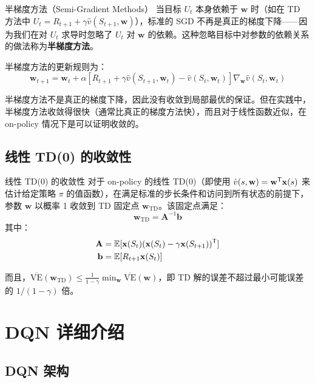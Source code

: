 \begin{mydefinition}{半梯度方法（Semi-Gradient Methods）}
当目标 $U_t$ 本身依赖于 $\mathbf{w}$ 时（如在 TD 方法中 $U_t = R_{t+1} + \gamma \hat{v}(S_{t+1}, \mathbf{w})$），标准的 SGD 不再是真正的梯度下降——因为我们在对 $U_t$ 求导时忽略了 $U_t$ 对 $\mathbf{w}$ 的依赖。这种忽略目标中对参数的依赖关系的做法称为\textbf{半梯度方法}。
\end{mydefinition}

半梯度方法的更新规则为：
$$\mathbf{w}_{t+1} = \mathbf{w}_t + \alpha \left[ R_{t+1} + \gamma \hat{v}(S_{t+1}, \mathbf{w}_t) - \hat{v}(S_t, \mathbf{w}_t) \right] \nabla_{\mathbf{w}} \hat{v}(S_t, \mathbf{w}_t)$$

\begin{remark}
半梯度方法不是真正的梯度下降，因此没有收敛到局部最优的保证。但在实践中，半梯度方法收敛得很快（通常比真正的梯度方法快），而且对于线性函数近似，在 on-policy 情况下是可以证明收敛的。
\end{remark}

\subsection{线性 TD(0) 的收敛性}

\begin{myTheorem}{线性 TD(0) 的收敛性}
对于 on-policy 的线性 TD(0)（即使用 $\hat{v}(s,\mathbf{w}) = \mathbf{w}^{\mathsf{T}}\mathbf{x}(s)$ 来估计给定策略 $\pi$ 的值函数），在满足标准的步长条件和访问到所有状态的前提下，参数 $\mathbf{w}$ 以概率 1 收敛到 TD 固定点 $\mathbf{w}_{\text{TD}}$。该固定点满足：
$$\mathbf{w}_{\text{TD}} = \mathbf{A}^{-1} \mathbf{b}$$
其中：
\begin{align*}
\mathbf{A} &= \mathbb{E}[\mathbf{x}(S_t)(\mathbf{x}(S_t) - \gamma \mathbf{x}(S_{t+1}))^{\mathsf{T}}] \\
\mathbf{b} &= \mathbb{E}[R_{t+1} \mathbf{x}(S_t)]
\end{align*}

而且，$\overline{\text{VE}}(\mathbf{w}_{\text{TD}}) \leq \frac{1}{1-\gamma} \min_{\mathbf{w}} \overline{\text{VE}}(\mathbf{w})$，即 TD 解的误差不超过最小可能误差的 $1/(1-\gamma)$ 倍。
\end{myTheorem}

\section{DQN 详细介绍}

\subsection{DQN 架构}


